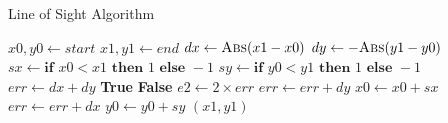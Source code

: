 \documentclass{article}
\begin{document}
\begin{algorithm}
\caption{Line of Sight Algorithm}
\begin{algorithmic}[1] %
    \State $x0, y0 \gets start$
    \State $x1, y1 \gets end$
    \State $dx \gets \Call{Abs}{x1 - x0}$
    \State $dy \gets -\Call{Abs}{y1 - y0}$
    \State $sx \gets \textbf{if } x0 < x1 \textbf{ then } 1 \textbf{ else } -1$
    \State $sy \gets \textbf{if } y0 < y1 \textbf{ then } 1 \textbf{ else } -1$
    \State $err \gets dx + dy$
            \State \Return \textbf{True}
        \EndIf
            \State \Return \textbf{False}
        \EndIf
        \State $e2 \gets 2 \times err$
            \State $err \gets err + dy$
            \State $x0 \gets x0 + sx$
        \EndIf
            \State $err \gets err + dx$
            \State $y0 \gets y0 + sy$
        \EndIf
    \EndWhile
    \State \Return $(x1,y1)$
\EndFunction
\end{algorithmic}
\end{algorithm}
\end{document}

